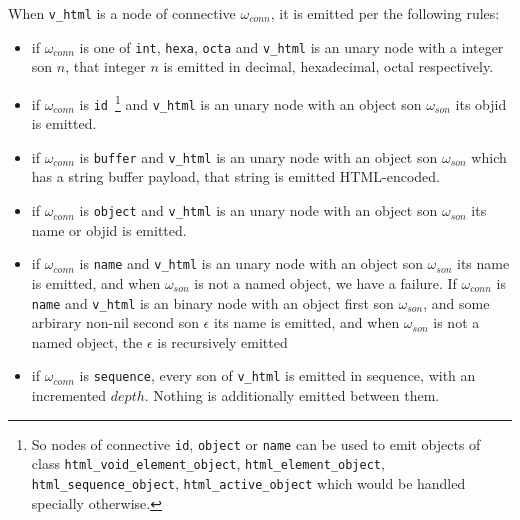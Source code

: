 When  \texttt{v\_html} is a node of connective $\omega_{conn}$, it is emitted per the following rules:

\begin{itemize}

\item if $\omega_{conn}$ is one of \texttt{int}, \texttt{hexa},
  \texttt{octa} and \texttt{v\_html} is an unary node with a integer
  son $n$, that integer $n$ is emitted in decimal, hexadecimal, octal respectively.

\item if $\omega_{conn}$ is \texttt{id}~\footnote{So nodes of
  connective \texttt{id}, \texttt{object} or \texttt{name} can be used
  to emit objects of class \texttt{html\_void\_element\_object},
  \texttt{html\_element\_object}, \texttt{html\_sequence\_object},
  \texttt{html\_active\_object} which would be handled specially
  otherwise.}  and \texttt{v\_html} is an unary node with an object
  son $\omega_{son}$ its objid is emitted.
  
\item if $\omega_{conn}$ is \texttt{buffer} and \texttt{v\_html} is an
  unary node with an object son $\omega_{son}$ which has a string
  buffer payload, that string is emitted HTML-encoded.
  
\item if $\omega_{conn}$ is \texttt{object} and \texttt{v\_html} is an unary node with an object son $\omega_{son}$ its name or objid is emitted.
  
\item if $\omega_{conn}$ is \texttt{name} and \texttt{v\_html} is an
  unary node with an object son $\omega_{son}$ its name is emitted,
  and when $\omega_{son}$ is not a named object, we have a failure. If $\omega_{conn}$ is \texttt{name} and \texttt{v\_html} is an
  binary node with an object first son $\omega_{son}$, and some arbirary non-nil second son $\epsilon$ its name is emitted,
  and when $\omega_{son}$ is not a named object, the $\epsilon$ is recursively emitted
  
\item if $\omega_{conn}$ is \texttt{sequence}, every son of
  \texttt{v\_html} is emitted in sequence, with an incremented
  $depth$. Nothing is additionally emitted between
  them. 


\end{itemize}
